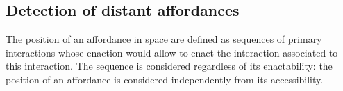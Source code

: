 \documentclass[conference]{IEEEtran}
\begin{document}










\subsection{Detection of distant affordances}

The position of an affordance in space are defined as sequences of primary interactions whose enaction would allow to enact the interaction associated to this interaction. The sequence is considered regardless of its enactability: the position of an affordance is considered independently from its accessibility.

\end{document}
